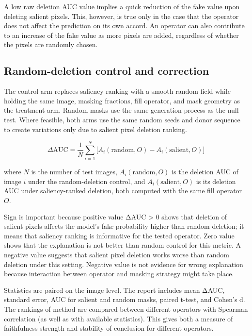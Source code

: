 A low raw deletion AUC value implies a quick reduction of the fake value
upon deleting salient pixels. This, however, is true only in the case
that the operator does not affect the prediction on its own accord. An
operator can also contribute to an increase of the fake value as more
pixels are added, regardless of whether the pixels are randomly chosen.

\subsection{\texorpdfstring{\textbf{Random-deletion control and
correction}}{Random-deletion control and correction}}\label{random-deletion-control-and-correction}

The control arm replaces saliency ranking with a smooth random field
while holding the same image, masking fractions, fill operator, and mask
geometry as the treatment arm. Random masks use the same generation
process as the null test. Where feasible, both arms use the same random
seeds and donor sequence to create variations only due to salient pixel
deletion ranking.

\begin{equation}
    \Delta\mathrm{AUC} = \frac{1}{N} \sum_{i=1}^{N} \Big[ A_i(\text{random}, O) - A_i(\text{salient}, O) \Big]
    \label{eq:delta-auc}
\end{equation}

\noindent where $N$ is the number of test images, $A_i(\text{random}, O)$
is the deletion AUC of image $i$ under the random-deletion control, and
$A_i(\text{salient}, O)$ is its deletion AUC under saliency-ranked
deletion, both computed with the same fill operator $O$.

Sign is important because positive value ΔAUC \textgreater{} 0 shows
that deletion of salient pixels affects the model's fake probability
higher than random deletion; it means that saliency ranking is
informative for the tested operator. Zero value shows that the
explanation is not better than random control for this metric. A
negative value suggests that salient pixel deletion works worse than
random deletion under this setting. Negative value is not evidence for
wrong explanation because interaction between operator and masking
strategy might take place.

Statistics are paired on the image level. The report includes mean ΔAUC,
standard error, AUC for salient and random masks, paired t-test, and
Cohen's d. The rankings of method are compared between different
operators with Spearman correlation (as well as with available
statistics). This gives both a measure of faithfulness strength and
stability of conclusion for different operators.

